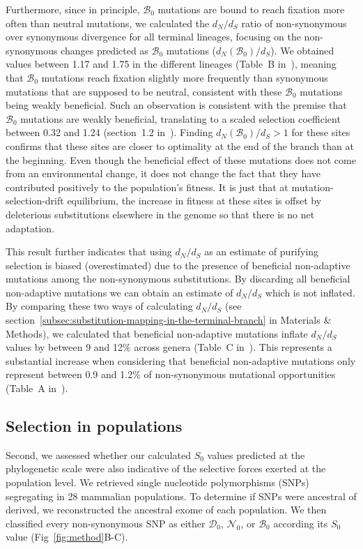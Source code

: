 \documentclass[10pt,letterpaper]{article}
\newcommand{\dn}{d_N}
\newcommand{\ds}{d_S}
\newcommand{\dnds}{\dn / \ds}
\newcommand{\Sphy}{S_{0}}
\newcommand{\SphyDel}{\mathcal{D}_0}
\newcommand{\SphyNeu}{\mathcal{N}_0}
\newcommand{\SphyBen}{\mathcal{B}_0}
\begin{document}
Furthermore, since in principle, $\SphyBen$ mutations are bound to reach fixation more often than neutral mutations, we calculated the $\dnds$ ratio of non-synonymous over synonymous divergence for all terminal lineages, focusing on the non-synonymous changes predicted as $\SphyBen$ mutations ($\dn(\SphyBen) / \ds$).
We obtained values between 1.17 and 1.75 in the different lineages (Table~B in~), meaning that $\SphyBen$ mutations reach fixation slightly more frequently than synonymous mutations that are supposed to be neutral, consistent with these $\SphyBen$ mutations being weakly beneficial.
Such an observation is consistent with the premise that $\SphyBen$ mutations are weakly beneficial, translating to a scaled selection coefficient between 0.32 and 1.24 (section~1.2 in~).
Finding $\dn(\SphyBen) / \ds > 1$ for these sites confirms that these sites are closer to optimality at the end of the branch than at the beginning.
Even though the beneficial effect of these mutations does not come from an environmental change, it does not change the fact that they have contributed positively to the population’s fitness.
It is just that at mutation-selection-drift equilibrium, the increase in fitness at these sites is offset by deleterious substitutions elsewhere in the genome so that there is no net adaptation.

This result further indicates that using $\dnds$ as an estimate of purifying selection is biased (overestimated) due to the presence of beneficial non-adaptive mutations among the non-synonymous substitutions.
By discarding all beneficial non-adaptive mutations we can obtain an estimate of $\dnds$ which is not inflated.
By comparing these two ways of calculating $\dnds$ (see section~\ref{subsec:substitution-mapping-in-the-terminal-branch} in Materials \& Methods), we calculated that beneficial non-adaptive mutations inflate $\dnds$ values by between 9 and 12\% across genera (Table~C in~).
This represents a substantial increase when considering that beneficial non-adaptive mutations only represent between 0.9 and 1.2\% of non-synonymous mutational opportunities (Table~A in~).


\subsection*{Selection in populations}
Second, we assessed whether our calculated $\Sphy$ values predicted at the phylogenetic scale were also indicative of the selective forces exerted at the population level.
We retrieved single nucleotide polymorphisms (SNPs) segregating in 28 mammalian populations.
To determine if SNPs were ancestral of derived, we reconstructed the ancestral exome of each population.
We then classified every non-synonymous SNP as either $\SphyDel$, $\SphyNeu$, or $\SphyBen$ according its $\Sphy$ value (Fig~\ref{fig:method}B-C).
\end{document}
